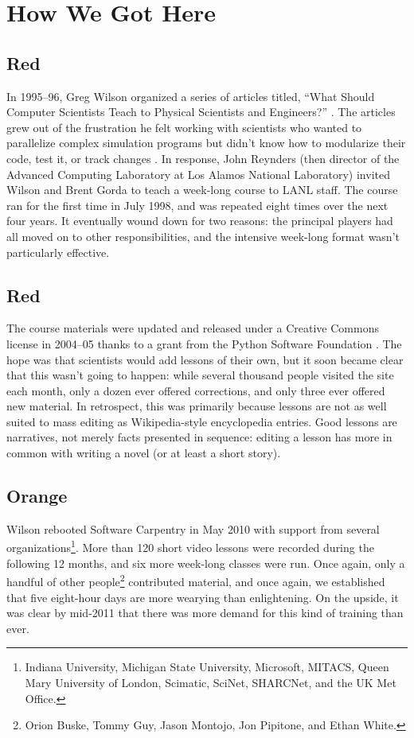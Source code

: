 \documentclass{article}
\begin{document}
\section{How We Got Here}

\subsection*{Red}

In 1995--96,
Greg Wilson organized a series of articles titled,
``What Should Computer Scientists Teach to Physical Scientists and Engineers?''
\cite{wilson1996}.
The articles grew out of the frustration he felt working with scientists
who wanted to parallelize complex simulation programs
but didn't know how to modularize their code,
test it,
or track changes
\cite{wilson2006a}.
In response,
John Reynders
(then director of the Advanced Computing Laboratory at Los Alamos National Laboratory)
invited Wilson and Brent Gorda to teach
a week-long course to LANL staff.
The course ran for the first time in July 1998,
and was repeated eight times over the next four years.
It eventually wound down for two reasons:
the principal players had all moved on to other responsibilities,
and the intensive week-long format wasn't particularly effective.

\subsection*{Red}

The course materials were updated and released under a Creative Commons license in 2004--05
thanks to a grant from the Python Software Foundation \cite{wilson2006b}.
The hope was that scientists would add lessons of their own,
but it soon became clear that this wasn't going to happen:
while several thousand people visited the site each month,
only a dozen ever offered corrections,
and only three ever offered new material.
In retrospect,
this was primarily because lessons are not as well suited to mass editing
as Wikipedia-style encyclopedia entries.
Good lessons are narratives,
not merely facts presented in sequence:
editing a lesson has more in common with writing a novel
(or at least a short story).

\subsection*{Orange}

Wilson rebooted Software Carpentry in May 2010
with support from several organizations\footnote{Indiana University,
Michigan State University,
Microsoft,
MITACS,
Queen Mary University of London,
Scimatic,
SciNet,
SHARCNet,
and the UK Met Office.}.
More than 120 short video lessons were recorded during the following 12 months,
and six more week-long classes were run.
Once again,
only a handful of other people\footnote{Orion Buske, Tommy Guy, Jason Montojo, Jon Pipitone, and Ethan White.} contributed material,
and once again,
we established that five eight-hour days are more wearying than enlightening.
On the upside,
it was clear by mid-2011 that there was more demand for this kind of training than ever.
\end{document}
